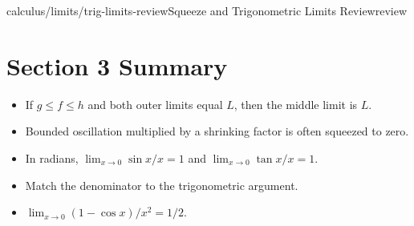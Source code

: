 \begin{webpage}{calculus/limits/trig-limits-review}{Squeeze and Trigonometric Limits Review}{review}
\section*{Section 3 Summary}

\begin{bgsummary}
\begin{itemize}
  \item If \(g\le f\le h\) and both outer limits equal \(L\), then the middle limit is \(L\).
  \item Bounded oscillation multiplied by a shrinking factor is often squeezed to zero.
  \item In radians, \(\lim_{x\to0}\sin x/x=1\) and \(\lim_{x\to0}\tan x/x=1\).
  \item Match the denominator to the trigonometric argument.
  \item \(\lim_{x\to0}(1-\cos x)/x^2=1/2\).
\end{itemize}
\end{bgsummary}
\end{webpage}

